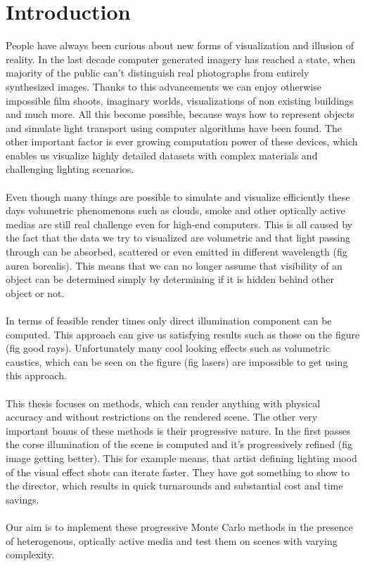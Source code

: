\chapter{Introduction}
People have always been curious about new forms of visualization and illusion of reality. In the last decade computer generated imagery has reached a state, when majority of the public can't distinguish real photographs from entirely synthesized images. Thanks to this advancements we can enjoy otherwise impossible film shoots, imaginary worlds, visualizations of non existing buildings and much more. All this become possible, because ways how to represent objects and simulate light transport using computer algorithms have been found. The other important factor is ever growing computation power of these devices, which enables us visualize highly detailed datasets with complex materials and challenging lighting scenarios.
\\
\\
Even though many things are possible to simulate and visualize efficiently these days volumetric phenomenons such as clouds, smoke and other optically active medias are still real challenge even for high-end computers. This is all caused by the fact that the data we try to visualized are volumetric and that light passing through can be absorbed, scattered or even emitted in different wavelength (fig aurea borealis). This means that we can no longer assume that visibility of an object can be determined simply by determining if it is hidden behind other object or not.
\\
\\
In terms of feasible render times only direct illumination component can be computed. This approach can give us satisfying results such as those on the figure (fig good rays).  Unfortunately many cool looking effects such as volumetric caustics, which can be seen on the figure (fig lasers) are impossible to get using this approach.
\\
\\
This thesis focuses on methods, which can render anything with physical accuracy and without restrictions on the rendered scene. The other very important bonus of these methods is their progressive nature. In the first passes the corse illumination of the scene is computed and it's progressively refined (fig image getting better). This for example means, that artist defining lighting mood of the visual effect shots can iterate faster. They have got something to show to the director, which results in quick turnarounds and substantial cost and time savings.
\\
\\
Our aim is to implement these progressive Monte Carlo methods in the presence of heterogenous, optically active media and test them on scenes with varying complexity.
\\
\\

